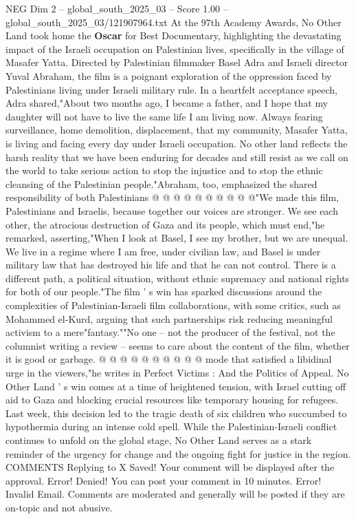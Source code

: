 \begin{textsample}{NEG Dim 2 – global\_south\_2025\_03 – Score 1.00 – global\_south\_2025\_03/121907964.txt}  \label{ex:f2_neg_161}
At the 97th Academy Awards, No Other Land took home the \textbf{Oscar} for Best Documentary, highlighting the devastating impact of the Israeli occupation on Palestinian lives, specifically in the village of Masafer Yatta.
Directed by Palestinian filmmaker Basel Adra and Israeli director Yuval Abraham, the film is a poignant exploration of the oppression faced by Palestinians living under Israeli military rule.
In a heartfelt acceptance speech, Adra shared,"About two months ago, I became a father, and I hope that my daughter will not have to live the same life I am living now.
Always fearing surveillance, home demolition, displacement, that my community, Masafer Yatta, is living and facing every day under Israeli occupation.
No other land reflects the harsh reality that we have been enduring for decades and still resist as we call on the world to take serious action to stop the injustice and to stop the ethnic cleansing of the Palestinian people."Abraham, too, emphasized the shared responsibility of both Palestinians @ @ @ @ @ @ @ @ @ @"We made this film, Palestinians and Israelis, because together our voices are stronger.
We see each other, the atrocious destruction of Gaza and its people, which must end,"he remarked, asserting,"When I look at Basel, I see my brother, but we are unequal.
We live in a regime where I am free, under civilian law, and Basel is under military law that has destroyed his life and that he can not control.
There is a different path, a political situation, without ethnic supremacy and national rights for both of our people."The film ' s win has sparked discussions around the complexities of Palestinian-Israeli film collaborations, with some critics, such as Mohammed el-Kurd, arguing that such partnerships risk reducing meaningful activism to a mere"fantasy.""No one -- not the producer of the festival, not the columnist writing a review -- seems to care about the content of the film, whether it is good or garbage. @ @ @ @ @ @ @ @ @ @ mode that satisfied a libidinal urge in the viewers,"he writes in Perfect Victims : And the Politics of Appeal.
No Other Land ' s win comes at a time of heightened tension, with Israel cutting off aid to Gaza and blocking crucial resources like temporary housing for refugees.
Last week, this decision led to the tragic death of six children who succumbed to hypothermia during an intense cold spell.
While the Palestinian-Israeli conflict continues to unfold on the global stage, No Other Land serves as a stark reminder of the urgency for change and the ongoing fight for justice in the region.
COMMENTS Replying to X Saved!
Your comment will be displayed after the approval.
Error!
Denied!
You can post your comment in 10 minutes.
Error!
Invalid Email.
Comments are moderated and generally will be posted if they are on-topic and not abusive.

\end{textsample}

